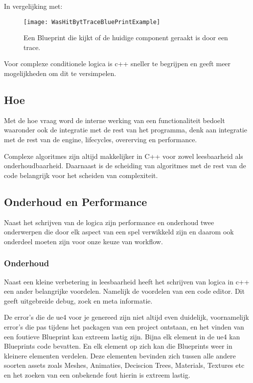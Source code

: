 In vergelijking met:

\begin{figure}[!ht]
  \centering
    \texttt{[image: WasHitBytTraceBluePrintExample]}
    \caption{Een Blueprint die kijkt of de huidige component geraakt is door een trace.}
\end{figure}

Voor complexe conditionele logica is c++ sneller te begrijpen en geeft meer mogelijkheden om dit te versimpelen. 

\subsection{Hoe}
Met de hoe vraag word de interne werking van een functionaliteit bedoelt waaronder ook de integratie met de rest van het programma, denk aan integratie met de rest van de engine, lifecycles, overerving en performance.

Complexe algoritmes zijn altijd makkelijker in C++ voor zowel leesbaarheid als onderhoudbaarheid. Daarnaast is de scheiding van algoritmes met de rest van de code belangrijk voor het scheiden van complexiteit.

\subsection{Onderhoud en Performance}
Naast het schrijven van de logica zijn performance en onderhoud twee onderwerpen die door elk aspect van een spel verwikkeld zijn en daarom ook onderdeel moeten zijn voor onze keuze van workflow.

\subsubsection{Onderhoud}
Naast een kleine verbetering in leesbaarheid heeft het schrijven van logica in c++ een ander belangrijke voordelen. Namelijk de voordelen van een code editor. Dit geeft uitgebreide debug, zoek en meta informatie. 

De error’s die de \gls{ue4} voor je genereed zijn niet altijd even duidelijk, voornamelijk error’s die pas tijdens het packagen van een project ontstaan, en het vinden van een foutieve Blueprint kan extreem lastig zijn. Bijna elk element in de \gls{ue4} kan Blueprints code bevatten. En elk element op zich kan die Blueprints weer in kleinere elementen verdelen. Deze elementen bevinden zich tussen alle andere soorten assets zoals Meshes, Animaties, Deciscion Trees, Materials, Textures etc en het zoeken van een onbekende fout hierin is extreem lastig.

